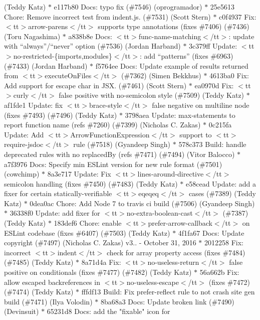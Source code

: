 \begin{DoxyItemize}
(\+Teddy Katz) \texorpdfstring{$\ast$}{*} e117b80 Docs\+: typo fix (\#7546) (oprogramador) \texorpdfstring{$\ast$}{*} 25e5613 Chore\+: Remove incorrect test from indent.\+js. (\#7531) (\+Scott Stern) \texorpdfstring{$\ast$}{*} c0f4937 Fix\+: $<$tt$>$arrow-\/parens$<$/tt$>$ supports type annotations (fixes \#7406) (\#7436) (\+Toru Nagashima) \texorpdfstring{$\ast$}{*} a838b8e Docs\+: $<$tt$>$func-\/name-\/matching$<$/tt$>$\+: update with “always”/“never” option (\#7536) (\+Jordan Harband) \texorpdfstring{$\ast$}{*} 3c379ff Update\+: $<$tt$>$no-\/restricted-\/\{imports,modules\}$<$/tt$>$\+: add “patterns” (fixes \#6963) (\#7433) (\+Jordan Harband) \texorpdfstring{$\ast$}{*} f5764ee Docs\+: Update example of results returned from $<$tt$>$execute\+On\+Files$<$/tt$>$ (\#7362) (\+Simen Bekkhus) \texorpdfstring{$\ast$}{*} 4613ba0 Fix\+: Add support for escape char in JSX. (\#7461) (\+Scott Stern) \texorpdfstring{$\ast$}{*} ea0970d Fix\+: $<$tt$>$curly$<$/tt$>$ false positive with no-\/semicolon style (\#7509) (\+Teddy Katz) \texorpdfstring{$\ast$}{*} af1fde1 Update\+: fix $<$tt$>$brace-\/style$<$/tt$>$ false negative on multiline node (fixes \#7493) (\#7496) (\+Teddy Katz) \texorpdfstring{$\ast$}{*} 3798aea Update\+: max-\/statements to report function name (refs \#7260) (\#7399) (\+Nicholas C. Zakas) \texorpdfstring{$\ast$}{*} 0c215fa Update\+: Add $<$tt$>$\+Arrow\+Function\+Expression$<$/tt$>$ support to $<$tt$>$require-\/jsdoc$<$/tt$>$ rule (\#7518) (\+Gyandeep Singh) \texorpdfstring{$\ast$}{*} 578c373 Build\+: handle deprecated rules with no \textquotesingle{}replaced\+By\textquotesingle{} (refs \#7471) (\#7494) (\+Vitor Balocco) \texorpdfstring{$\ast$}{*} a7f3976 Docs\+: Specify min ESLint version for new rule format (\#7501) (cowchimp) \texorpdfstring{$\ast$}{*} 8a3e717 Update\+: Fix $<$tt$>$lines-\/around-\/directive$<$/tt$>$ semicolon handling (fixes \#7450) (\#7483) (\+Teddy Katz) \texorpdfstring{$\ast$}{*} e58cead Update\+: add a fixer for certain statically-\/verifiable $<$tt$>$eqeqeq$<$/tt$>$ cases (\#7389) (\+Teddy Katz) \texorpdfstring{$\ast$}{*} 0dea0ac Chore\+: Add Node 7 to travis ci build (\#7506) (\+Gyandeep Singh) \texorpdfstring{$\ast$}{*} 36338f0 Update\+: add fixer for $<$tt$>$no-\/extra-\/boolean-\/cast$<$/tt$>$ (\#7387) (\+Teddy Katz) \texorpdfstring{$\ast$}{*} 183def6 Chore\+: enable $<$tt$>$prefer-\/arrow-\/callback$<$/tt$>$ on ESLint codebase (fixes \#6407) (\#7503) (\+Teddy Katz) \texorpdfstring{$\ast$}{*} 4f1fa67 Docs\+: Update copyright (\#7497) (\+Nicholas C. Zakas)  v3.. -\/ October 31, 2016  \texorpdfstring{$\ast$}{*} 2012258 Fix\+: incorrect $<$tt$>$indent$<$/tt$>$ check for array property access (fixes \#7484) (\#7485) (\+Teddy Katz) \texorpdfstring{$\ast$}{*} 8a71d4a Fix\+: $<$tt$>$no-\/useless-\/return$<$/tt$>$ false positive on conditionals (fixes \#7477) (\#7482) (\+Teddy Katz) \texorpdfstring{$\ast$}{*} 56a662b Fix\+: allow escaped backreferences in $<$tt$>$no-\/useless-\/escape$<$/tt$>$ (fixes \#7472) (\#7474) (\+Teddy Katz) \texorpdfstring{$\ast$}{*} fffdf13 Build\+: Fix prefer-\/reflect rule to not crash site gen build (\#7471) (\+Ilya Volodin) \texorpdfstring{$\ast$}{*} 8ba68a3 Docs\+: Update broken link (\#7490) (\+Devinsuit) \texorpdfstring{$\ast$}{*} 65231d8 Docs\+: add the "{}fixable"{} icon for 
\end{DoxyItemize}
